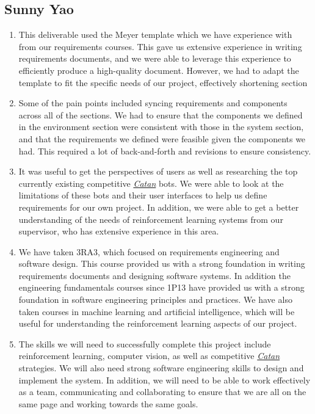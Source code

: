 \documentclass{article}
\newcommand{\Catan}{\href{https://en.wikipedia.org/wiki/Catan}{Catan}}
\begin{document}
\subsection*{Sunny Yao}\label{subsec:sunny-yao}
\begin{enumerate}
    \item 
    This deliverable used the Meyer template which we have experience with from
    our requirements courses. This gave us extensive experience in writing
    requirements documents, and we were able to leverage this experience to
    efficiently produce a high-quality document. However, we had to adapt the
    template to fit the specific needs of our project, effectively shortening
    section

    \item Some of the pain points included syncing requirements and components
    across all of the sections. We had to ensure that the components we
    defined in the environment section were consistent with those in the system
    section, and that the requirements we defined were feasible given the
    components we had. This required a lot of back-and-forth and revisions to
    ensure consistency.

    \item It was useful to get the perspectives of users as well as researching the 
    top currently existing competitive \emph{\Catan{}} bots. We were able to look at the limitations
    of these bots and their user interfaces to help us define requirements for our own project.
    In addition, we were able to get a better understanding of the needs of reinforcement
    learning systems from our supervisor, who has extensive experience in this area.

    \item We have taken 3RA3, which focused on requirements engineering and software design.
    This course provided us with a strong foundation in writing requirements documents
    and designing software systems. In addition the engineering fundamentals courses since
    1P13 have provided us with a strong foundation in software engineering principles and practices.
    We have also taken courses in machine learning and artificial intelligence, which will be useful
    for understanding the reinforcement learning aspects of our project.

    \item The skills we will need to successfully complete this project include reinforcement
    learning, computer vision, as well as competitive \emph{\Catan{}} strategies. We will also need
    strong software engineering skills to design and implement the system. In addition, we will
    need to be able to work effectively as a team, communicating and collaborating to ensure
    that we are all on the same page and working towards the same goals.


\end{enumerate}
\end{document}
